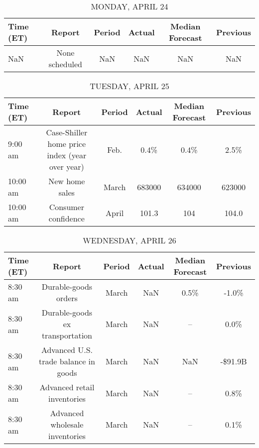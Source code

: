 \documentclass{article}%
\begin{document}
%
\normalsize%


\begin{table}[htbp]%
\caption{MONDAY, APRIL 24}%
\centering%
\begin{adjustbox}{width=1\textwidth}%
\begin{tabular}{lccccc}
\toprule
Time (ET) &         Report & Period & Actual & Median Forecast & Previous \\
\midrule
      NaN & None scheduled &    NaN &    NaN &             NaN &      NaN \\
\bottomrule
\end{tabular}
%
\end{adjustbox}%
\end{table}

%


\begin{table}[htbp]%
\caption{TUESDAY, APRIL 25}%
\centering%
\begin{adjustbox}{width=1\textwidth}%
\begin{tabular}{lccccc}
\toprule
Time (ET) &                                         Report & Period & Actual & Median Forecast & Previous \\
\midrule
  9:00 am & Case-Shiller home price index (year over year) &   Feb. &   0.4\% &            0.4\% &     2.5\% \\
 10:00 am &                                 New home sales &  March & 683000 &          634000 &   623000 \\
 10:00 am &                            Consumer confidence &  April &  101.3 &             104 &    104.0 \\
\bottomrule
\end{tabular}
%
\end{adjustbox}%
\end{table}

%


\begin{table}[htbp]%
\caption{WEDNESDAY, APRIL 26}%
\centering%
\begin{adjustbox}{width=1\textwidth}%
\begin{tabular}{lccccc}
\toprule
Time (ET) &                               Report & Period & Actual & Median Forecast & Previous \\
\midrule
  8:30 am &                 Durable-goods orders &  March &    NaN &            0.5\% &    -1.0\% \\
  8:30 am &      Durable-goods ex transportation &  March &    NaN &              -- &     0.0\% \\
  8:30 am & Advanced U.S. trade balance in goods &  March &    NaN &             NaN &  -\$91.9B \\
  8:30 am &          Advanced retail inventories &  March &    NaN &              -- &     0.8\% \\
  8:30 am &       Advanced wholesale inventories &  March &    NaN &              -- &     0.1\% \\
\bottomrule
\end{tabular}
%
\end{adjustbox}%
\end{table}
\end{document}
